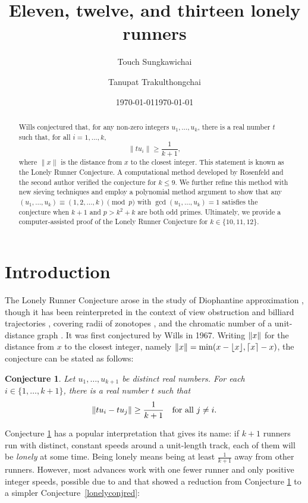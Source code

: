 \documentclass[11pt]{amsart}
\title{Eleven, twelve, and thirteen lonely runners}
\author[T. Sungkawichai]{Touch Sungkawichai}
\date{\today}
\author[T. Trakulthongchai]{Tanupat Trakulthongchai}
\date{\today}
\DeclarePairedDelimiter\norm{\lVert}{\rVert}
\newtheorem{conjecture}[theorem]{Conjecture}
\theoremstyle{definition}
\theoremstyle{remark}
\begin{document}
\begin{abstract}
    Wills conjectured that, for any non-zero integers $u_1,\ldots,u_k$, 
    there is a real number $t$ such that, for all $i=1,\ldots,k$, \[\lVert tu_i\rVert\geq\frac{1}{k+1},\] 
    where $\lVert x\rVert$ is the distance from $x$ to the closest integer. This statement is known as the Lonely Runner Conjecture.
    A computational method developed by Rosenfeld and the second author verified the conjecture for $k\leq9$.
    We further refine this method with new sieving techniques and employ a polynomial method argument to show that
    any $(u_1,\ldots,u_k)\equiv(1,2,\ldots,k)\pmod{p}$ with $\gcd(u_1,\ldots,u_k)=1$ satisfies the conjecture when $k+1$ and $p > k^2+k$ 
    are both odd primes. Ultimately, we provide a computer-assisted proof of the Lonely Runner Conjecture for $k\in\{10,11,12\}$.
\end{abstract}
\maketitle

\section{Introduction}
The Lonely Runner Conjecture arose in the study of Diophantine approximation \cite{Wills},
though it has been reinterpreted in the context of view obstruction and billiard trajectories 
\cite{cusick1984view}, covering radii of zonotopes \cite{henze_covering_2017}, and the chromatic number of a 
unit-distance graph \cite{zhu2002circular}. 
It was first conjectured by Wills \cite{Wills} in 1967.
Writing $\norm{x}$ for the distance from $x$ to the closest integer, namely $\norm{x}=\min(x-\lfloor x\rfloor, \lceil x\rceil-x)$, 
the conjecture can be stated as follows:

\begin{conjecture} \label{lonelyconj}
  Let $u_1,\ldots,u_{k+1}$ be distinct real numbers. For each $i \in\{1,\ldots,k+1\}$, there is a real number $t$ such that
  \[ \norm{t u_i-tu_j} \ge \frac{1}{k+1} \quad \text{for all } j \ne i. \]
\end{conjecture}

Conjecture \ref{lonelyconj} has a popular interpretation that gives its name: if $k+1$ runners run with distinct,
constant speeds around a unit-length track, each of them will be \emph{lonely} at some time. 
Being lonely means being at least $\tfrac{1}{k+1}$ away from other runners. 
However, most advances work with one fewer runner and only positive integer speeds, 
possible due to \cite{Bohman} and \cite{henze_covering_2017} that showed a reduction from Conjecture \ref{lonelyconj}
to a simpler Conjecture~\ref{lonelyconjred}:
\end{document}
